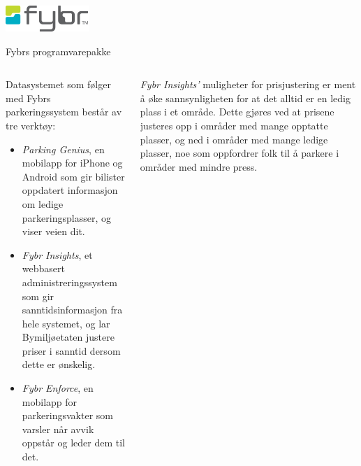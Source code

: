 \documentclass[xetex]{beamer}
\begin{document}
\begin{frame}	
	\hfill\includegraphics[scale=0.3]{grafikk/logoer/fybr.png} \\ [-10em]
	\begin{center}{\large Fybrs programvarepakke}\end{center}
	\begin{columns}[onlytextwidth]
		\begin{column}{0.5\textwidth}
			Datasystemet som følger med Fybrs parkeringssystem består av tre verktøy:
	
			\begin{itemize}
				\item \emph{Parking Genius}, en mobilapp for iPhone og Android  som \alert{gir bilister oppdatert informasjon} om ledige parkeringsplasser, og viser veien dit.
				\item \emph{Fybr Insights}, et \alert{webbasert administreringssystem} som gir sanntidsinformasjon fra hele systemet, og lar Bymiljøetaten justere priser i sanntid dersom dette er ønskelig.
				\item \emph{Fybr Enforce}, en mobilapp for parkeringsvakter som \alert{varsler når avvik oppstår} og leder dem til det.
			\end{itemize}
		\end{column}
		\begin{column}{0.4\textwidth}
			\emph{Fybr Insights'} muligheter for \alert{prisjustering} er ment å øke sannsynligheten for at det alltid er en ledig plass i et område. Dette gjøres ved at prisene justeres opp i områder med mange opptatte plasser, og ned i områder med mange ledige plasser, noe som oppfordrer folk til å parkere i områder med mindre press.

		\end{column}
	\end{columns}
\end{frame}
\end{document}
